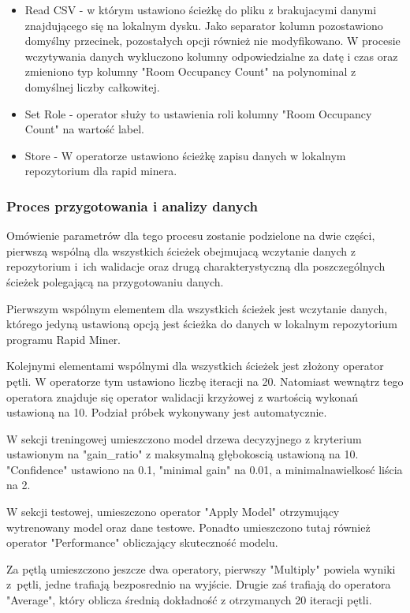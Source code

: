 \documentclass[12pt,oneside,a4paper]{book} %
\theoremstyle{break}
\begin{document}
\begin{itemize}
  \item Read CSV - w którym ustawiono ścieżkę do pliku z brakujacymi danymi znajdującego się na lokalnym dysku. Jako separator kolumn pozostawiono domyślny przecinek, pozostałych opcji również nie modyfikowano. W procesie wczytywania danych wykluczono kolumny odpowiedzialne za datę i czas oraz zmieniono typ kolumny "Room Occupancy Count" na polynominal z domyślnej liczby całkowitej.
  \item Set Role - operator służy to ustawienia roli kolumny "Room Occupancy Count" na wartość label.
  \item Store - W operatorze ustawiono ścieżkę zapisu danych w lokalnym repozytorium dla rapid minera.
\end{itemize}

\subsubsection*{Proces przygotowania i analizy danych}

Omówienie parametrów dla tego procesu zostanie podzielone na dwie części, pierwszą wspólną dla wszystkich ścieżek obejmujacą wczytanie danych z repozytorium i~ich walidacje oraz drugą charakterystyczną dla poszczególnych ścieżek polegającą na przygotowaniu danych.

Pierwszym wspólnym elementem dla wszystkich ścieżek jest wczytanie danych, którego jedyną ustawioną opcją jest ścieżka do danych w lokalnym repozytorium programu Rapid Miner.

Kolejnymi elementami wspólnymi dla wszystkich ścieżek jest złożony operator pętli. W operatorze tym ustawiono liczbę iteracji na 20. Natomiast wewnątrz tego operatora znajduje się operator walidacji krzyżowej z wartością wykonań ustawioną na 10. Podział próbek wykonywany jest automatycznie.

W sekcji treningowej umieszczono model drzewa decyzyjnego z kryterium ustawionym na "gain\_ratio" z maksymalną głębokoscią ustawioną na 10. "Confidence" ustawiono na 0.1, "minimal gain" na 0.01, a minimalnawielkosć liścia na 2.

W sekcji testowej, umieszczono operator "Apply Model" otrzymujący wytrenowany model oraz dane testowe. Ponadto umieszczono tutaj również operator "Performance" obliczający skuteczność modelu.

Za pętlą umieszczono jeszcze dwa operatory, pierwszy "Multiply" powiela wyniki z~pętli, jedne trafiają bezposrednio na wyjście. Drugie zaś trafiają do operatora "Average", który oblicza średnią dokładność z otrzymanych 20 iteracji pętli.
\end{document}
